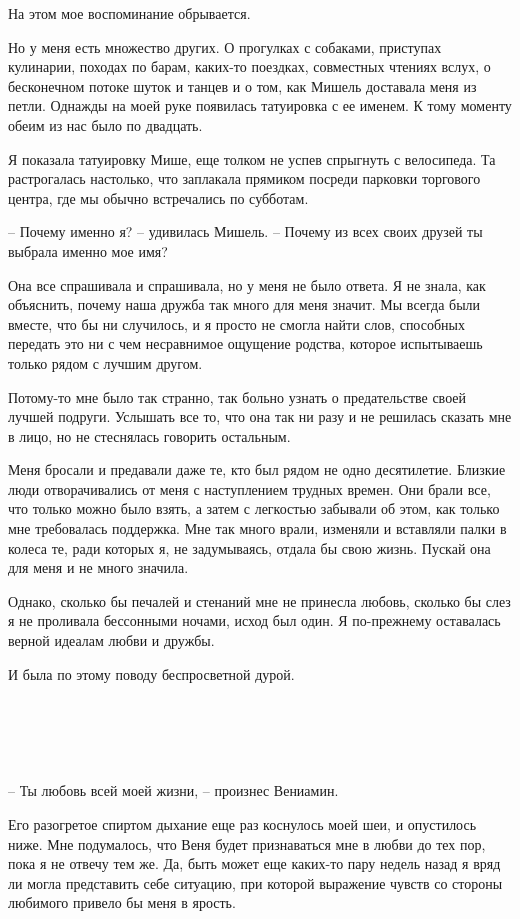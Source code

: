 \documentclass[
]{book}
\begin{document}
На этом мое воспоминание обрывается.

Но у меня есть множество других. О прогулках с собаками, приступах кулинарии, походах по барам, каких-то поездках, совместных чтениях вслух, о бесконечном потоке шуток и танцев и о том, как Мишель доставала меня из петли. Однажды на моей руке появилась татуировка с ее именем. К тому моменту обеим из нас было по двадцать.

Я показала татуировку Мише, еще толком не успев спрыгнуть с велосипеда. Та растрогалась настолько, что заплакала прямиком посреди парковки торгового центра, где мы обычно встречались по субботам.

-- Почему именно я? -- удивилась Мишель. -- Почему из всех своих друзей ты выбрала именно мое имя?

Она все спрашивала и спрашивала, но у меня не было ответа. Я не знала, как объяснить, почему наша дружба так много для меня значит. Мы всегда были вместе, что бы ни случилось, и я просто не смогла найти слов, способных передать это ни с чем несравнимое ощущение родства, которое испытываешь только рядом с лучшим другом.

Потому-то мне было так странно, так больно узнать о предательстве своей лучшей подруги. Услышать все то, что она так ни разу и не решилась сказать мне в лицо, но не стеснялась говорить остальным.

Меня бросали и предавали даже те, кто был рядом не одно десятилетие. Близкие люди отворачивались от меня с наступлением трудных времен. Они брали все, что только можно было взять, а затем с легкостью забывали об этом, как только мне требовалась поддержка. Мне так много врали, изменяли и вставляли палки в колеса те, ради которых я, не задумываясь, отдала бы свою жизнь. Пускай она для меня и не много значила.

Однако, сколько бы печалей и стенаний мне не принесла любовь, сколько бы слез я не проливала бессонными ночами, исход был один. Я по-прежнему оставалась верной идеалам любви и дружбы.

И была по этому поводу беспросветной дурой.

\hypertarget{chapter-55}{%
\chapter{~}\label{chapter-55}}

-- Ты любовь всей моей жизни, -- произнес Вениамин.

Его разогретое спиртом дыхание еще раз коснулось моей шеи, и опустилось ниже. Мне подумалось, что Веня будет признаваться мне в любви до тех пор, пока я не отвечу тем же. Да, быть может еще каких-то пару недель назад я вряд ли могла представить себе ситуацию, при которой выражение чувств со стороны любимого привело бы меня в ярость.
\end{document}
